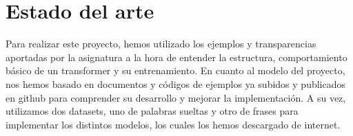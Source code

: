 \documentclass{article}
\begin{document}
\vspace{2cm}
\section{\Huge Estado del arte}
\begin{Large}
\vspace{0.5cm}
Para realizar este proyecto, hemos utilizado los ejemplos y transparencias aportadas por la asignatura a la hora de entender la estructura, comportamiento básico de un transformer y su entrenamiento. En cuanto al modelo del proyecto, nos hemos basado en documentos y códigos de ejemplos ya subidos y publicados en github para comprender su desarrollo y mejorar la implementación. A su vez, utilizamos dos datasets, uno de palabras sueltas y otro de frases para implementar los distintos modelos, los cuales los hemos descargado de internet.
\end{Large}

\vspace{2cm}
\end{document}
